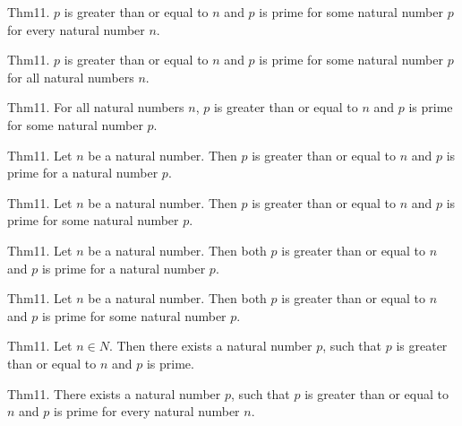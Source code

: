 \documentclass{article}
\begin{document}
Thm11. $p$ is greater than or equal to $n$ and $p$ is prime for some natural number $p$ for every natural number $n$.

Thm11. $p$ is greater than or equal to $n$ and $p$ is prime for some natural number $p$ for all natural numbers $n$.

Thm11. For all natural numbers $n$, $p$ is greater than or equal to $n$ and $p$ is prime for some natural number $p$.

Thm11. Let $n$ be a natural number. Then $p$ is greater than or equal to $n$ and $p$ is prime for a natural number $p$.

Thm11. Let $n$ be a natural number. Then $p$ is greater than or equal to $n$ and $p$ is prime for some natural number $p$.

Thm11. Let $n$ be a natural number. Then both $p$ is greater than or equal to $n$ and $p$ is prime for a natural number $p$.

Thm11. Let $n$ be a natural number. Then both $p$ is greater than or equal to $n$ and $p$ is prime for some natural number $p$.

Thm11. Let $n \in N$. Then there exists a natural number $p$, such that $p$ is greater than or equal to $n$ and $p$ is prime.

Thm11. There exists a natural number $p$, such that $p$ is greater than or equal to $n$ and $p$ is prime for every natural number $n$.
\end{document}
